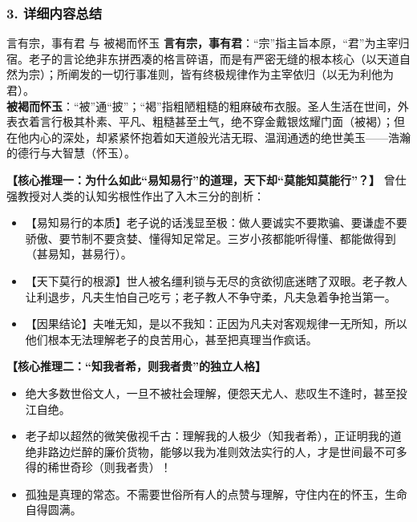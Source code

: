 \subsubsection{3. 详细内容总结}

\begin{ConceptBox}{言有宗，事有君 与 被褐而怀玉}
\textbf{言有宗，事有君}：“宗”指主旨本原，“君”为主宰归宿。老子的言论绝非东拼西凑的格言碎语，而是有严密无缝的根本核心（以天道自然为宗）；所阐发的一切行事准则，皆有终极规律作为主宰依归（以无为利他为君）。\\
\textbf{被褐而怀玉}：“被”通“披”；“褐”指粗陋粗糙的粗麻破布衣服。圣人生活在世间，外表衣着言行极其朴素、平凡、粗糙甚至土气，绝不穿金戴银炫耀门面（被褐）；但在他内心的深处，却紧紧怀抱着如天道般光洁无瑕、温润通透的绝世美玉——浩瀚的德行与大智慧（怀玉）。
\end{ConceptBox}

\noindent\textbf{【核心推理一：为什么如此“易知易行”的道理，天下却“莫能知莫能行”？】}
曾仕强教授对人类的认知劣根性作出了入木三分的剖析：
\begin{itemize}
    \item 【易知易行的本质】老子说的话浅显至极：做人要诚实不要欺骗、要谦虚不要骄傲、要节制不要贪婪、懂得知足常足。三岁小孩都能听得懂、都能做得到（甚易知，甚易行）。
    \item 【天下莫行的根源】世人被名缰利锁与无尽的贪欲彻底迷瞎了双眼。老子教人让利退步，凡夫生怕自己吃亏；老子教人不争守柔，凡夫急着争抢当第一。
    \item 【因果结论】夫唯无知，是以不我知：正因为凡夫对客观规律一无所知，所以他们根本无法理解老子的良苦用心，甚至把真理当作疯话。
\end{itemize}

\noindent\textbf{【核心推理二：“知我者希，则我者贵”的独立人格】}
\begin{itemize}
    \item 绝大多数世俗文人，一旦不被社会理解，便怨天尤人、悲叹生不逢时，甚至投江自绝。
    \item 老子却以超然的微笑傲视千古：理解我的人极少（知我者希），正证明我的道绝非路边烂醉的廉价货物，能够以我为准则效法实行的人，才是世间最不可多得的稀世奇珍（则我者贵）！
    \item 孤独是真理的常态。不需要世俗所有人的点赞与理解，守住内在的怀玉，生命自得圆满。
\end{itemize}


